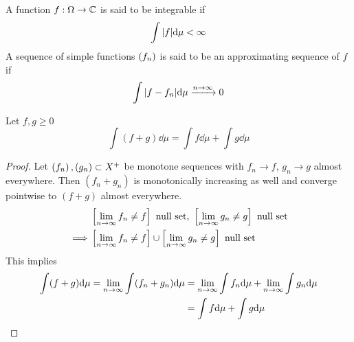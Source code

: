 \documentclass[../../script.tex]{subfiles}
\begin{document}
\begin{defi}
    A function $f: \Omega \rightarrow \mathbb{C}$ is said to be integrable if 
    \[
        \int \abs{f} \dd\mu < \infty
    \]
    A sequence of simple functions $\left(f_n\right)$ is said to be an approximating sequence of $f$ if 
    \[
        \int \abs{f - f_n} \dd\mu \conv{n \rightarrow \infty} 0
    \]
\end{defi}

\begin{cor}
    Let $f, g \ge 0$
    \[
        \int (f + g) \dd\mu = \int f \dd\mu + \int g \dd\mu
    \]
\end{cor}
\begin{proof}
    Let $\left(f_n\right), \left(g_n\right) \subset X^+$ be monotone sequences with $f_n \rightarrow f$, $g_n \rightarrow g$ almost everywhere.
    Then $(f_n + g_n)$ is monotonically increasing as well and converge pointwise to $(f + g)$ almost everywhere.
    \begin{equation} 
        \begin{split}
            &\left[\lim_{n \rightarrow \infty} f_n \ne f\right] \text{ null set, } \left[\lim_{n \rightarrow \infty} g_n \ne g \right] \text{ null set} \\
            \implies &\left[\lim_{n \rightarrow \infty} f_n \ne f\right] \cup \left[\lim_{n \rightarrow \infty} g_n \ne g\right] \text{ null set}
        \end{split}
    \end{equation}
    This implies 
    \begin{equation}
        \begin{split}
            \int (f + g) \dd\mu = \lim_{n \rightarrow \infty} \int (f_n + g_n) \dd\mu &= \lim_{n \rightarrow \infty} \int f_n \dd\mu + \lim_{n \rightarrow \infty} \int g_n \dd\mu \\
            &= \int f \dd\mu + \int g \dd\mu
        \end{split}
    \end{equation}
\end{proof}
\end{document}
